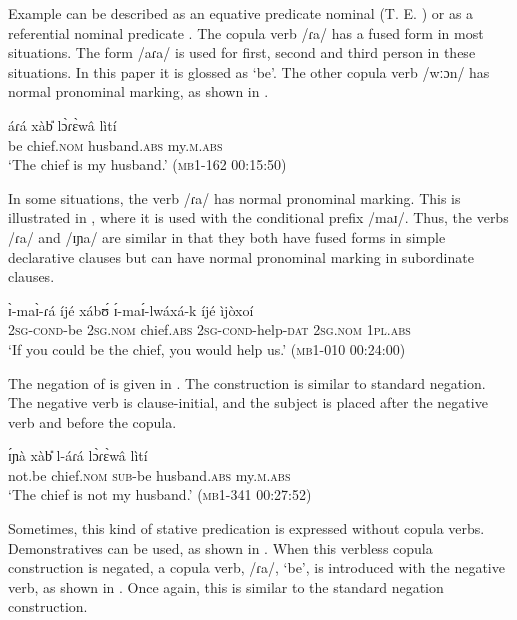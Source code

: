 \documentclass[output=paper,colorlinks,citecolor=brown,draftmode]{langscibook}
\begin{document}
Example  can be described as an equative predicate nominal (T. E. \citealt[114]{Payne1997}) or as a referential nominal predicate \citep[233]{Dryer2007}.  The copula verb /ɾa/ has a fused form in most situations.  The form /aɾa/ is used for first, second and third person in these situations. In this paper it is glossed as ‘be’. The other copula verb /wːɔn/ has normal pronominal marking, as shown in .

\ea\label{ex:lop:28}
        \gll áɾá xàb{\U} lɔ̀ɾɛ̀wâ lìtí \\
             be chief\textsc{.nom} husband\textsc{.abs} my.\textsc{m.abs} \\ 
        \glt ‘The chief is my husband.’       (\textsc{mb1-162} \textsc{00:}15:50)
\z

In some situations, the verb /ɾa/ has normal pronominal marking. This is illustrated in , where it is used with the conditional prefix /maɪ/. Thus, the verbs /ɾa/ and /ɪɲa/ are similar in that they both have fused forms in simple declarative clauses but can have normal pronominal marking in subordinate clauses.

\ea\label{ex:lop:29}
        \gll ɪ̀-maɪ̀-ɾá íjé xábʊ́ ɪ́-maɪ́-lwáxá-k íjé ìjòxoí \\ 
             2\textsc{sg}{}-\textsc{cond}{}-be \textsc{2sg.nom} chief\textsc{.abs} 2\textsc{sg}{}-\textsc{cond}{}-help-\textsc{dat} \textsc{2sg.nom} \textsc{1pl.abs} \\
        \glt ‘If you could be the chief, you would help us.’       (\textsc{mb1-010} \textsc{00:}24:00)
\z

The negation of  is given in . The construction is similar to standard negation. The negative verb is clause-initial, and the subject is placed after the negative verb and before the copula. 

\ea\label{ex:lop:30}
        \gll ɪ́ɲà xàb{\U} l-áɾá lɔ̀ɾɛ̀wâ lìtí \\
             not.be chief\textsc{.nom} \textsc{sub-}be husband\textsc{.abs} my.\textsc{m.abs} \\
        \glt ‘The chief is not my husband.’  (\textsc{mb1-341} 00:27:52)
\z

Sometimes, this kind of stative predication is expressed without copula verbs. Demonstratives can be used, as shown in . When this verbless copula construction is negated, a copula verb, /ɾa/, ‘be’, is introduced with the negative verb, as shown in . Once again, this is similar to the standard negation construction.
\end{document}
